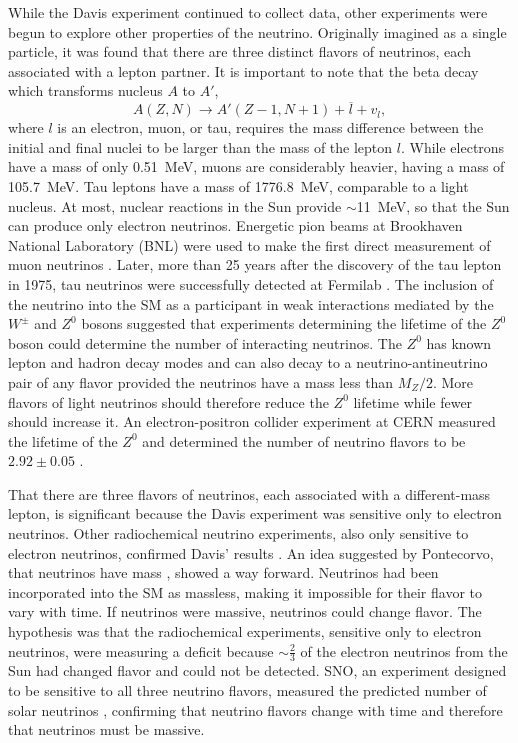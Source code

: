 While the Davis experiment continued to collect data, other experiments were begun to explore other properties of the neutrino.  Originally imagined as a single particle, it was found that there are three distinct flavors of neutrinos, each associated with a lepton partner.  It is important to note that the beta decay which transforms nucleus $A$ to $A'$,
\begin{equation}
A(Z,N) \rightarrow A'(Z-1,N+1) + \overline{l} + v_l,
\end{equation}
where $l$ is an electron, muon, or tau, requires the mass difference between the initial and final nuclei to be larger than the mass of the lepton $l$.  While electrons have a mass of only 0.51~MeV, muons are considerably heavier, having a mass of 105.7~MeV.  Tau leptons have a mass of 1776.8~MeV, comparable to a light nucleus. At most, nuclear reactions in the Sun provide $\sim$11~MeV, so that the Sun can produce only electron neutrinos.  Energetic pion beams at Brookhaven National Laboratory (BNL) were used to make the first direct measurement of muon neutrinos \citep{muonNeutrino}.  Later, more than 25 years after the discovery of the tau lepton \citep{tauDiscovery} in 1975, tau neutrinos were successfully detected at Fermilab \citep{tauNeutrino}.  The inclusion of the neutrino into the SM as a participant in weak interactions mediated by the $W^{\pm}$ and $Z^0$ bosons suggested that experiments determining the lifetime of the $Z^0$ boson could determine the number of interacting neutrinos.  The $Z^0$ has known lepton and hadron decay modes \citep{PDG} and can also decay to a neutrino-antineutrino pair of any flavor provided the neutrinos have a mass less than $M_Z/2$.  More flavors of light neutrinos should therefore reduce the $Z^0$ lifetime while fewer should increase it.   An electron-positron collider experiment at CERN measured the lifetime of the $Z^0$ and determined the number of neutrino flavors to be $2.92\pm0.05$ \citep{PDG}.

That there are three flavors of neutrinos, each associated with a different-mass lepton, is significant because the Davis experiment was sensitive only to electron neutrinos.  Other radiochemical neutrino experiments, also only sensitive to electron neutrinos, confirmed Davis' results \citep{SNO_Sun,SuperK_Sun,PDG}.  An idea suggested by Pontecorvo, that neutrinos have mass \citep{Pontecorvo}, showed a way forward.  Neutrinos had been incorporated into the SM as massless, making it impossible for their flavor to vary with time.  If neutrinos were massive, neutrinos could change flavor.  The hypothesis was that the radiochemical experiments, sensitive only to electron neutrinos, were measuring a deficit because $\sim\frac{2}{3}$ of the electron neutrinos from the Sun had changed flavor and could not be detected.  SNO, an experiment designed to be sensitive to all three neutrino flavors, measured the predicted number of solar neutrinos \citep{SNO_Sun}, confirming that neutrino flavors change with time and therefore that neutrinos must be massive.

